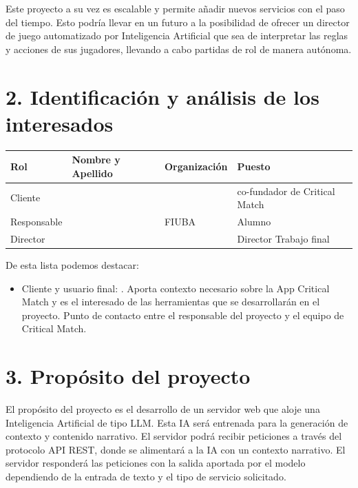 \documentclass[
11pt, %
]{Clases/charter}
\begin{document}
Este proyecto a su vez es escalable y permite añadir nuevos servicios con el paso del tiempo.
Esto podría llevar en un futuro a la posibilidad de ofrecer un director de juego automatizado por Inteligencia Artificial que sea de interpretar las reglas y acciones de sus jugadores,
llevando a cabo partidas de rol de manera autónoma.


\section{2. Identificación y análisis de los interesados}
\label{sec:interesados}

\begin{table}[ht]
	\begin{tabularx}{\linewidth}{@{}|l|X|X|l|@{}}
		\hline
		\rowcolor[HTML]{C0C0C0}
		Rol         & Nombre y Apellido & Organización    & Puesto                        \\ \hline
		Cliente     & \clientename      & \empclientename & co-fundador de Critical Match \\ \hline
		Responsable & \authorname       & FIUBA           & Alumno                        \\ \hline
		Director    & \supname          & \pertesupname   & Director Trabajo final        \\ \hline
	\end{tabularx}
\end{table}

De esta lista podemos destacar:
\begin{itemize}
	\item Cliente y usuario final: \clientename.
	      Aporta contexto necesario sobre la App Critical Match y es el interesado de las herramientas que se desarrollarán en el proyecto.
	      Punto de contacto entre el responsable del proyecto y el equipo de Critical Match.
\end{itemize}

\section{3. Propósito del proyecto}
\label{sec:proposito}
El propósito del proyecto es el desarrollo de un servidor web que aloje una Inteligencia Artificial de tipo LLM.
Esta IA será entrenada para la generación de contexto y contenido narrativo.
El servidor podrá recibir peticiones a través del protocolo API REST,
donde se alimentará a la IA con un contexto narrativo.
El servidor responderá las peticiones con la salida aportada por el modelo
dependiendo de la entrada de texto y el tipo de servicio solicitado.
\end{document}
